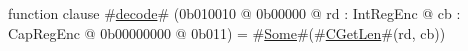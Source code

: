 function clause #\hyperref[zdecode]{decode}# (0b010010 @ 0b00000 @ rd : IntRegEnc @ cb : CapRegEnc @ 0b00000000 @ 0b011) = #\hyperref[zSome]{Some}#(#\hyperref[zCGetLen]{CGetLen}#(rd, cb))
